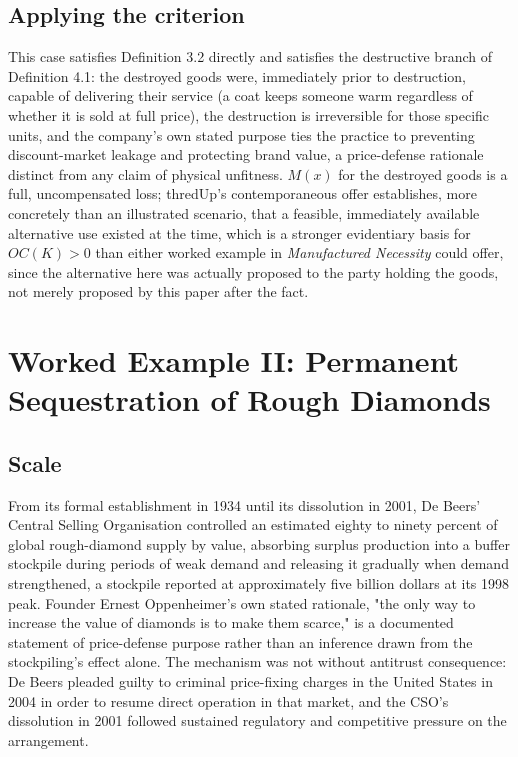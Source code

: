 \documentclass[11pt]{article}
\begin{document}
\subsection{Applying the criterion}

This case satisfies Definition 3.2 directly and satisfies the destructive branch of Definition 4.1: the destroyed goods were, immediately prior to destruction, capable of delivering their service (a coat keeps someone warm regardless of whether it is sold at full price), the destruction is irreversible for those specific units, and the company's own stated purpose ties the practice to preventing discount-market leakage and protecting brand value, a price-defense rationale distinct from any claim of physical unfitness. $M(x)$ for the destroyed goods is a full, uncompensated loss; thredUp's contemporaneous offer establishes, more concretely than an illustrated scenario, that a feasible, immediately available alternative use existed at the time, which is a stronger evidentiary basis for $OC(K) > 0$ than either worked example in \emph{Manufactured Necessity} could offer, since the alternative here was actually proposed to the party holding the goods, not merely proposed by this paper after the fact.

\section{Worked Example II: Permanent Sequestration of Rough Diamonds}

\subsection{Scale}

From its formal establishment in 1934 until its dissolution in 2001, De Beers' Central Selling Organisation controlled an estimated eighty to ninety percent of global rough-diamond supply by value, absorbing surplus production into a buffer stockpile during periods of weak demand and releasing it gradually when demand strengthened, a stockpile reported at approximately five billion dollars at its 1998 peak. Founder Ernest Oppenheimer's own stated rationale, "the only way to increase the value of diamonds is to make them scarce," is a documented statement of price-defense purpose rather than an inference drawn from the stockpiling's effect alone. The mechanism was not without antitrust consequence: De Beers pleaded guilty to criminal price-fixing charges in the United States in 2004 in order to resume direct operation in that market, and the CSO's dissolution in 2001 followed sustained regulatory and competitive pressure on the arrangement.
\end{document}
